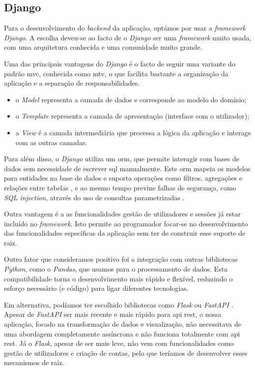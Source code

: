 \subsection{Django}

Para o desenvolvimento do \textit{backend} da aplicação, optámos por usar a \textit{framework} \textit{Django}. A escolha deveu-se ao facto de o \textit{Django} ser uma \textit{framework} muito usada, com uma arquitetura conhecida e uma comunidade muito grande.

Uma das principais vantagens do \textit{Django}\cite{djangodocs} é o facto de seguir uma variante do padrão \gls{mvc}, conhecida como \gls{mtv},  o que facilita bastante a organização da aplicação e a separação de responsabilidades.

\begin{itemize}
    \item o \textit{Model} representa a camada de dados e corresponde ao modelo do domínio;

    \item o \textit{Template} representa a camada de apresentação (interface com o utilizador);

    \item a \textit{View} é a camada intermediária que processa a lógica da aplicação e interage com as outras camadas.
\end{itemize}

Para além disso, o \textit{Django} utiliza um \gls{orm}, que permite interagir com bases de dados sem necessidade de escrever \gls{sql} manualmente. Este \gls{orm} mapeia os modelos para entidades na base de dados e suporta operações como filtros, agregações e relações entre tabelas \cite{djangodocs}, e ao mesmo tempo previne falhas de segurança, como \textit{SQL injection}, através do uso de consultas parametrizadas \cite{kumar2016security}.

Outra vantagem é a as funcionalidades gestão de utilizadores e sessões já estar incluído no \textit{framework}. Isto permite ao programador focar-se no desenvolvimento das funcionalidades específicas da aplicação sem ter de construir esse suporte de raiz.

Outro fator que consideramos positivo foi a integração com outras bibliotecas \textit{Python}, como o \textit{Pandas}, que usamos para o processamento de dados. Esta compatibilidade torna o desenvolvimento mais rápido e flexível, reduzindo o esforço necessário (e código) para ligar diferentes tecnologias.

Em alternativa, podíamos ter escolhido bibliotecas como \textit{Flask} \cite{grinberg2018flask} ou \textit{FastAPI} \cite{tiangolo2018fastapi}. Apesar de \textit{FastAPI} ser mais recente e mais rápido para \gls{api} \gls{rest}, o nossa aplicação, focado na transformação de dados e visualização, não necessitava de uma abordagem completamente assíncrona e não funciona totalmente com \gls{api} \gls{rest}. Já o \textit{Flask}, apesar de ser mais leve, não vem com funcionalidades como gestão de utilizadores e criação de contas, pelo que teríamos de desenvolver esses mecanismos de raiz.

